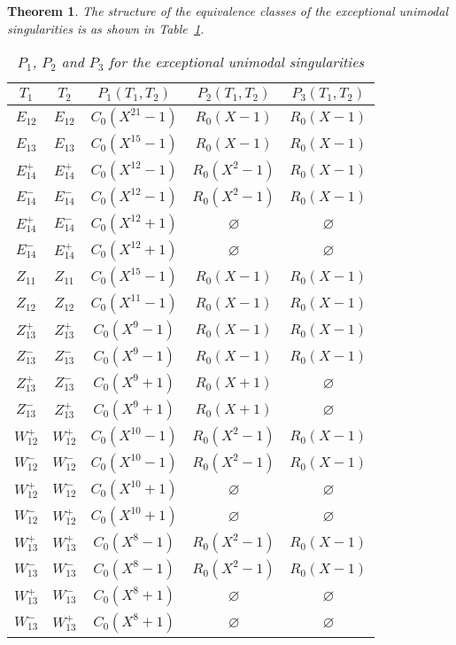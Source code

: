 \documentclass{amsproc}
\newtheorem{theorem}{Theorem}
\theoremstyle{definition}
\begin{document}
\begin{theorem}\label{thm:exceptional}
The structure of the equivalence classes of the exceptional unimodal
singularities is as shown in Table~\ref{tab:exceptional_equivalences}.

\begin{table}[!htbp]
\centering
\caption{$P_1$, $P_2$ and $P_3$ for the exceptional unimodal singularities}
\label{tab:exceptional_equivalences}
\begin{tabular}{|c|c||c|c|c|}
\hline
$T_1$ & $T_2$ & $P_1(T_1, T_2)$ & $P_2(T_1, T_2)$ & $P_3(T_1, T_2)$ \\
\hline\hline
$E_{12}$   & $E_{12}$   & $C_0(X^{21}-1)$ & $R_0(X-1)$    & $R_0(X-1)$ \\
\hline
$E_{13}$   & $E_{13}$   & $C_0(X^{15}-1)$ & $R_0(X-1)$    & $R_0(X-1)$ \\
\hline
$E_{14}^+$ & $E_{14}^+$ & $C_0(X^{12}-1)$ & $R_0(X^2-1)$  & $R_0(X-1)$ \\
\hline
$E_{14}^-$ & $E_{14}^-$ & $C_0(X^{12}-1)$ & $R_0(X^2-1)$  & $R_0(X-1)$ \\
\hline
$E_{14}^+$ & $E_{14}^-$ & $C_0(X^{12}+1)$ & $\varnothing$ & $\varnothing$ \\
\hline
$E_{14}^-$ & $E_{14}^+$ & $C_0(X^{12}+1)$ & $\varnothing$ & $\varnothing$ \\
\hline
$Z_{11}$   & $Z_{11}$   & $C_0(X^{15}-1)$ & $R_0(X-1)$    & $R_0(X-1)$ \\
\hline
$Z_{12}$   & $Z_{12}$   & $C_0(X^{11}-1)$ & $R_0(X-1)$    & $R_0(X-1)$ \\
\hline
$Z_{13}^+$ & $Z_{13}^+$ & $C_0(X^9-1)$    & $R_0(X-1)$    & $R_0(X-1)$ \\
\hline
$Z_{13}^-$ & $Z_{13}^-$ & $C_0(X^9-1)$    & $R_0(X-1)$    & $R_0(X-1)$ \\
\hline
$Z_{13}^+$ & $Z_{13}^-$ & $C_0(X^9+1)$    & $R_0(X+1)$    & $\varnothing$ \\
\hline
$Z_{13}^-$ & $Z_{13}^+$ & $C_0(X^9+1)$    & $R_0(X+1)$    & $\varnothing$ \\
\hline
$W_{12}^+$ & $W_{12}^+$ & $C_0(X^{10}-1)$ & $R_0(X^2-1)$  & $R_0(X-1)$ \\
\hline
$W_{12}^-$ & $W_{12}^-$ & $C_0(X^{10}-1)$ & $R_0(X^2-1)$  & $R_0(X-1)$ \\
\hline
$W_{12}^+$ & $W_{12}^-$ & $C_0(X^{10}+1)$ & $\varnothing$ & $\varnothing$ \\
\hline
$W_{12}^-$ & $W_{12}^+$ & $C_0(X^{10}+1)$ & $\varnothing$ & $\varnothing$ \\
\hline
$W_{13}^+$ & $W_{13}^+$ & $C_0(X^8-1)$    & $R_0(X^2-1)$  & $R_0(X-1)$ \\
\hline
$W_{13}^-$ & $W_{13}^-$ & $C_0(X^8-1)$    & $R_0(X^2-1)$  & $R_0(X-1)$ \\
\hline
$W_{13}^+$ & $W_{13}^-$ & $C_0(X^8+1)$    & $\varnothing$ & $\varnothing$ \\
\hline
$W_{13}^-$ & $W_{13}^+$ & $C_0(X^8+1)$    & $\varnothing$ & $\varnothing$ \\
\hline
\end{tabular}
\end{table}

\end{theorem}
\end{document}

